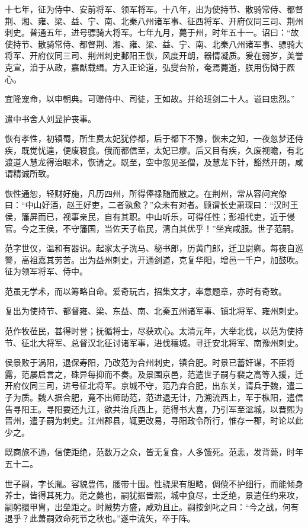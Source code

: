 \documentclass[12pt,UTF8]{ctexbook}
\begin{document}
十七年，征为侍中、安前将军、领军将军。十八年，出为使持节、散骑常侍、都督荆、湘、雍、梁、益、宁、南、北秦八州诸军事、征西将军、开府仪同三司、荆州刺史。普通五年，进号骠骑大将军。七年九月，薨于州，时年五十一。诏曰：“故使持节、散骑常侍、都督荆、湘、雍、梁、益、宁、南、北秦八州诸军事、骠骑大将军、开府仪同三司、荆州刺史鄱阳王恢，风度开朗，器情凝质。爰在弱岁，美誉克宣，洎于从政，嘉猷载缉。方入正论道，弘燮台阶，奄焉薨逝，朕用伤恸于厥心。

宜隆宠命，以申朝典。可赠侍中、司徒，王如故。并给班剑二十人。谥曰忠烈。”

遣中书舍人刘显护丧事。

恢有孝性，初镇蜀，所生费太妃犹停都，后于都下不豫，恢未之知，一夜忽梦还侍疾，既觉忧遑，便废寝食。俄而都信至，太妃已瘳。后又目有疾，久废视瞻，有北渡道人慧龙得治眼术，恢请之。既至，空中忽见圣僧，及慧龙下针，豁然开朗，咸谓精诚所致。

恢性通恕，轻财好施，凡历四州，所得俸禄随而散之。在荆州，常从容问宾僚曰：“中山好酒，赵王好吏，二者孰愈？”众未有对者。顾谓长史萧琛曰：“汉时王侯，籓屏而已，视事亲民，自有其职。中山听乐，可得任性；彭祖代吏，近于侵官。今之王侯，不守籓国，当佐天子临民，清白其优乎！”坐宾咸服。世子范嗣。

范字世仪，温和有器识。起家太子洗马、秘书郎，历黄门郎，迁卫尉卿。每夜自巡警，高祖嘉其劳苦。出为益州刺史，开通剑道，克复华阳，增邑一千户，加鼓吹。征为领军将军、侍中。

范虽无学术，而以筹略自命。爱奇玩古，招集文才，率意题章，亦时有奇致。

复出为使持节、都督雍、梁、东益、南、北秦五州诸军事、镇北将军、雍州刺史。

范作牧莅民，甚得时誉；抚循将士，尽获欢心。太清元年，大举北伐，以范为使持节、征北大将军、总督汉北征讨诸军事，进伐穰城。寻迁安北将军、南豫州刺史。

侯景败于涡阳，退保寿阳，乃改范为合州刺史，镇合肥。时景已蓄奸谋，不臣将露，范屡启言之，硃异每抑而不奏。及景围京邑，范遣世子嗣与裴之高等入援，迁开府仪同三司，进号征北将军。京城不守，范乃弃合肥，出东关，请兵于魏，遣二子为质。魏人据合肥，竟不出师助范，范进退无计，乃溯流西上，军于枞阳，遣信告寻阳王。寻阳要还九江，欲共治兵西上，范得书大喜，乃引军至湓城，以晋熙为晋州，遣子嗣为刺史。江州郡县，辄更改易，寻阳政令所行，惟存一郡，时论以此少之。

既商旅不通，信使距绝，范数万之众，皆无复食，人多饿死。范恚，发背薨，时年五十二。

世子嗣，字长胤。容貌豊伟，腰带十围。性骁果有胆略，倜傥不护细行，而能倾身养士，皆得其死力。范之薨也，嗣犹据晋熙，城中食尽，士乏绝，景遣任约来攻，嗣躬擐甲胄，出垒距之。时贼势方盛，咸劝且止。嗣按剑叱之曰：“今之战，何有退乎？此萧嗣效命死节之秋也。”遂中流矢，卒于阵。
\end{document}
